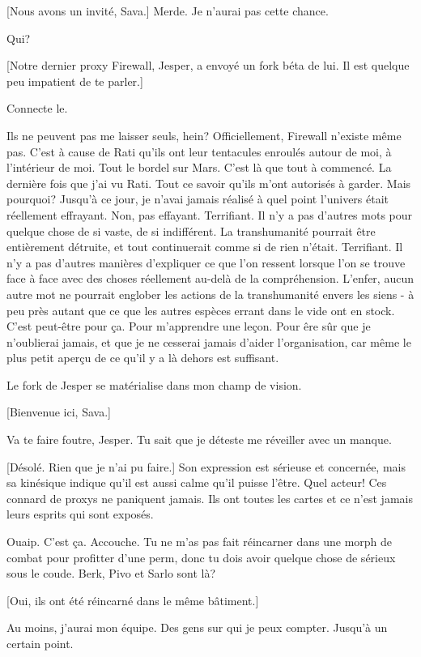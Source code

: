 [Nous avons un invité, Sava.] Merde. Je n'aurai pas cette chance. 

Qui? 

[Notre dernier proxy Firewall, Jesper, a envoyé un fork béta de lui. Il est quelque peu impatient de te parler.] 

Connecte le. 

Ils ne peuvent pas me laisser seuls, hein? Officiellement, Firewall n'existe même pas. C'est à cause de Rati qu'ils ont leur tentacules enroulés autour de moi, à l'intérieur de moi. Tout le bordel sur Mars. C'est là que tout à commencé. La dernière fois que j'ai vu Rati. Tout ce savoir qu'ils m'ont autorisés à garder. Mais pourquoi? Jusqu'à ce jour, je n'avai jamais réalisé à quel point l'univers était réellement effrayant. Non, pas effayant. Terrifiant. Il n'y a pas d'autres mots pour quelque chose de si vaste, de si indifférent. La transhumanité pourrait être entièrement détruite, et tout continuerait comme si de rien n'était. Terrifiant. Il n'y a pas d'autres manières d'expliquer ce que l'on ressent lorsque l'on se trouve face à face avec des choses réellement au-delà de la compréhension. L'enfer, aucun autre mot ne pourrait englober les actions de la transhumanité envers les siens - à peu près autant que ce que les autres espèces errant dans le vide ont en stock. C'est peut-être pour ça. Pour m'apprendre une leçon. Pour êre sûr que je n'oublierai jamais, et que je ne cesserai jamais d'aider l'organisation, car même le plus petit aperçu de ce qu'il y a là dehors est suffisant. 

Le fork de Jesper se matérialise dans mon champ de vision. 

[Bienvenue ici, Sava.] 

Va te faire foutre, Jesper. Tu sait que je déteste me réveiller avec un manque. 

[Désolé. Rien que je n'ai pu faire.] Son expression est sérieuse et concernée, mais sa kinésique indique qu'il est aussi calme qu'il puisse l'être. Quel acteur! Ces connard de proxys ne paniquent jamais. Ils ont toutes les cartes et ce n'est jamais leurs esprits qui sont exposés. 

Ouaip. C'est ça. Accouche. Tu ne m'as pas fait réincarner dans une morph de combat pour profitter d'une perm, donc tu dois avoir quelque chose de sérieux sous le coude. Berk, Pivo et Sarlo sont là? 

[Oui, ils ont été réincarné dans le même bâtiment.] 

Au moins, j'aurai mon équipe. Des gens sur qui je peux compter. Jusqu'à un certain point. 


